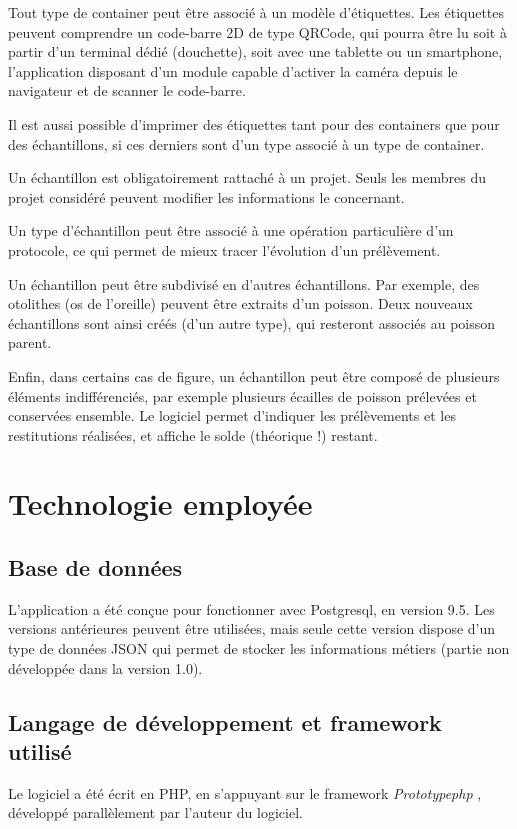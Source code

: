 Tout type de container peut être associé à un modèle d'étiquettes. Les étiquettes peuvent comprendre un code-barre 2D de type QRCode, qui pourra être lu soit à partir d'un terminal dédié (douchette), soit avec une tablette ou un smartphone, l'application disposant d'un module capable d'activer la caméra depuis le navigateur et de scanner le code-barre.

Il est aussi possible d'imprimer des étiquettes tant pour des containers que pour des échantillons, si ces derniers sont d'un type associé à un type de container.

Un échantillon est obligatoirement rattaché à un projet. Seuls les membres du projet considéré peuvent modifier les informations le concernant. 

Un type d'échantillon peut être associé à une opération particulière d'un protocole, ce qui permet de mieux tracer l'évolution d'un prélèvement.

Un échantillon peut être subdivisé en d'autres échantillons. Par exemple, des otolithes (os de l'oreille) peuvent être extraits d'un poisson. Deux nouveaux échantillons sont ainsi créés (d'un autre type), qui resteront associés au poisson parent.

Enfin, dans certains cas de figure, un échantillon peut être composé de plusieurs éléments indifférenciés, par exemple plusieurs écailles de poisson prélevées et conservées ensemble. Le logiciel permet d'indiquer les prélèvements et les restitutions réalisées, et affiche le solde (théorique !) restant.

\section{Technologie employée}
\subsection{Base de données}

L'application a été conçue pour fonctionner avec Postgresql, en version 9.5. Les versions antérieures peuvent être utilisées, mais seule cette version dispose d'un type de données JSON qui permet de stocker les informations métiers (partie non  développée dans la version 1.0).

\subsection{Langage de développement et framework utilisé}
Le logiciel a été écrit en PHP, en s'appuyant sur le framework \textit{Prototypephp} \cite{prototypephp}, développé parallèlement par l'auteur du logiciel.

